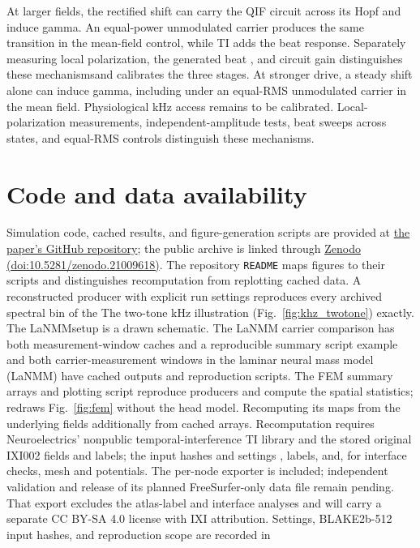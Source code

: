 \documentclass[11pt,a4paper]{article}
\providecommand{\DIFaddtex}[1]{{\protect\color{blue} \sf #1}} %
\providecommand{\DIFdeltex}[1]{{\protect\color{red} \scriptsize #1}} %
\providecommand{\DIFaddbegin}{} %
\providecommand{\DIFaddend}{} %
\providecommand{\DIFdelbegin}{} %
\providecommand{\DIFdelend}{} %
\providecommand{\DIFadd}[1]{\texorpdfstring{\DIFaddtex{#1}}{#1}} %
\providecommand{\DIFdel}[1]{\texorpdfstring{\DIFdeltex{#1}}{}} %
\begin{document}
\DIFdel{At larger fields, the rectified shift can carry the QIF circuit across its Hopf
and induce gamma. An equal-power unmodulated carrier produces the same transition
in the mean-field control, while TI adds the beat response. Separately measuring
local polarization, the generated beat , and circuit gain distinguishes these mechanismsand calibrates the three stages}\DIFdelend .
\DIFaddbegin \DIFadd{At stronger drive, a steady shift alone can induce gamma, including under an
equal-RMS unmodulated carrier in the mean field. Physiological kHz access remains
to be calibrated. Local-polarization measurements, independent-amplitude tests,
beat sweeps across states, and equal-RMS controls distinguish these mechanisms.
}\DIFaddend

\section*{Code and data availability}
Simulation code, cached results, and figure-generation scripts are provided at
\href{https://github.com/giulioruffini/TI-demodulation-paper}{the paper's GitHub repository};
the public archive is linked through
\href{https://doi.org/10.5281/zenodo.21009618}{Zenodo (doi:10.5281/zenodo.21009618)}.
The repository \texttt{README} maps figures to their scripts and distinguishes
recomputation from replotting cached data. \DIFdelbegin \DIFdel{A reconstructed producer with explicit
run settings reproduces every archived spectral bin of the }\DIFdelend \DIFaddbegin \DIFadd{The }\DIFaddend two-tone kHz \DIFdelbegin \DIFdel{illustration (Fig.~\ref{fig:khz_twotone}) exactly. The LaNMMsetup
is a drawn schematic. The LaNMM carrier comparison has both measurement-window
caches and a reproducible summary script}\DIFdelend \DIFaddbegin \DIFadd{example and both carrier-measurement windows in the laminar
neural mass model (LaNMM) have cached outputs and reproduction scripts}\DIFaddend . The FEM \DIFdelbegin \DIFdel{summary arrays and
plotting
script reproduce }\DIFdelend \DIFaddbegin \DIFadd{producers } \DIFadd{and
} \DIFadd{compute the spatial statistics;
} \DIFadd{redraws }\DIFaddend Fig.~\ref{fig:fem} \DIFdelbegin \DIFdel{without the head model. Recomputing its maps
from the underlying fields additionally }\DIFdelend \DIFaddbegin \DIFadd{from cached arrays.
Recomputation }\DIFaddend requires Neuroelectrics' nonpublic \DIFdelbegin \DIFdel{temporal-interference }\DIFdelend \DIFaddbegin \DIFadd{TI }\DIFaddend library and the \DIFdelbegin \DIFdel{stored }\DIFdelend \DIFaddbegin \DIFadd{original
}\DIFaddend IXI002 fields\DIFdelbegin \DIFdel{and labels;
the input hashes and settings }\DIFdelend \DIFaddbegin \DIFadd{, labels, and, for interface checks, mesh and potentials.
The per-node exporter } \DIFadd{is included;
independent validation and release of its planned FreeSurfer-only data file
remain pending. That export excludes the atlas-label and interface analyses
and will carry a separate CC BY-SA 4.0 license with IXI attribution.
Settings, BLAKE2b-512 input hashes, and reproduction scope }\DIFaddend are recorded in
\end{document}
